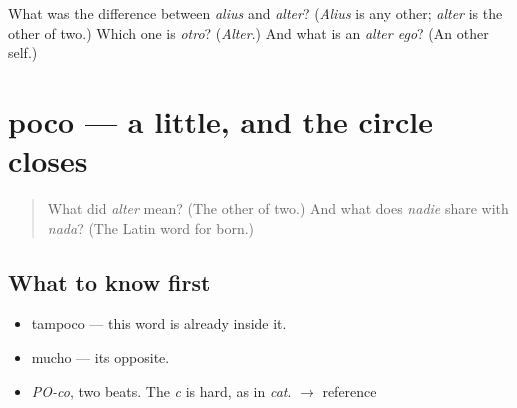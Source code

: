 \begin{tcolorbox}[breakable,colback=teal!4,colframe=teal!35!black,title={Before you move on}]
What was the difference between \emph{alius} and \emph{alter}? (\emph{Alius} is any other; \emph{alter} is the other of two.) Which one is \emph{otro}? (\emph{Alter}.) And what is an \emph{alter ego}? (An other self.)
\end{tcolorbox}
\section[poco]{poco — a little, and the circle closes}

\label{lesson:ES-C317-poco}



\begin{quote}
What did \emph{alter} mean? (The other of two.) And what does \emph{nadie} share with \emph{nada}? (The Latin word for born.)
\end{quote}

\subsection*{What to know first}
\begin{itemize}
\raggedright
  \item tampoco — this word is already inside it.
  \item mucho — its opposite.
\end{itemize}

\begin{sounds}
\begin{itemize}
\raggedright
  \item \emph{PO-co}, two beats. The \emph{c} is hard, as in \emph{cat}. $\to$ reference
\end{itemize}
\end{sounds}

